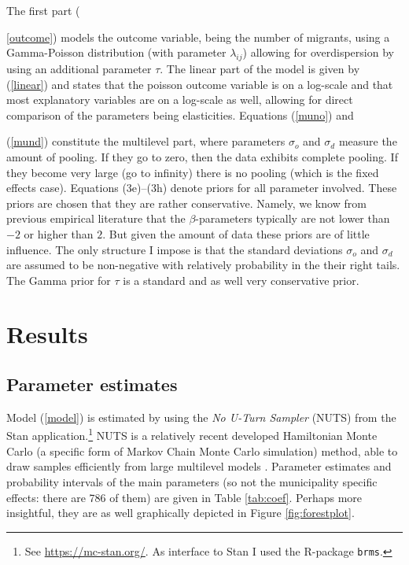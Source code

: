 \documentclass[fleqn,10pt]{SelfArx} %
\begin{document}
		  The first part ({\ref{outcome}) models the outcome variable,
          being the number of migrants, using a Gamma-Poisson distribution
          (with parameter $\lambda_{ij}$) allowing for overdispersion
          by using an additional parameter $\tau$. The linear part of
          the model is given by (\ref{linear}) and states that the
          poisson outcome variable is on a log-scale and that most explanatory
          variables are on a log-scale as well, allowing for direct
          comparison of the parameters being elasticities. Equations
          (\ref{muno}) and {(\ref{mund}) constitute the multilevel
            part, where parameters $\sigma_o$ and $\sigma_d$ measure
            the amount of pooling. If they go to zero, then the
            data exhibits complete pooling. If they become very large
            (go to infinity) there is no pooling (which is the fixed
            effects case). Equations (3e)--(3h) denote priors for all parameter involved.
            These priors are chosen that they are rather conservative. Namely, we know from previous empirical literature
            that the $\beta$-parameters typically are not lower than $-2$ or higher than $2$. But given the amount of
            data these priors are of little influence. The only structure 
            I impose is that the standard deviations $\sigma_o$ and $\sigma_d$ are assumed to be non-negative with 
            relatively probability in the their right tails. The Gamma prior for $\tau$ is a standard and as well very conservative prior.
                      
        \section{Results}

        \subsection{Parameter estimates}
        
        Model (\ref{model}) is estimated by using the \emph{No U-Turn
          Sampler} (NUTS) from the Stan application.\footnote{See \href{https://mc-stan.org/}{https://mc-stan.org/}. As interface to Stan
          \citep[see for an overview article of
          Stan][]{carpenter2017stan} I used the R-package \citep{brms} \texttt{brms}.} NUTS is a relatively recent developed Hamiltonian Monte Carlo (a specific form of Markov
        Chain Monte Carlo simulation) method, able to draw samples
        efficiently from large multilevel models
        \citep{hoffman2014no}. Parameter estimates and probability
        intervals of the main parameters (so not the municipality specific
        effects: there are 786 of them) are given in Table
        \ref{tab:coef}. Perhaps more insightful, they are as well graphically
        depicted in Figure \ref{fig:forestplot}.

}}
\end{document}
